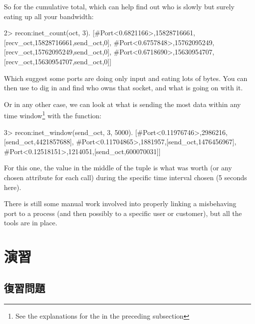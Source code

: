 So for the cumulative total, which can help find out who is slowly but surely eating up all your bandwidth:

\begin{VerbatimEshell}
2> recon:inet_count(oct, 3).
[{#Port<0.6821166>,15828716661,
  [{recv_oct,15828716661},{send_oct,0}]},
 {#Port<0.6757848>,15762095249,
  [{recv_oct,15762095249},{send_oct,0}]},
 {#Port<0.6718690>,15630954707,
  [{recv_oct,15630954707},{send_oct,0}]}]
\end{VerbatimEshell}

Which suggest some ports are doing only input and eating lots of bytes. You can then use  to dig in and find who owns that socket, and what is going on with it.

Or in any other case, we can look at what is sending the most data within any time window\footnote{See the explanations for the  in the preceding subsection} with the  function:

\begin{VerbatimEshell}
3> recon:inet_window(send_oct, 3, 5000).
[{#Port<0.11976746>,2986216,[{send_oct,4421857688}]},
 {#Port<0.11704865>,1881957,[{send_oct,1476456967}]},
 {#Port<0.12518151>,1214051,[{send_oct,600070031}]}]
\end{VerbatimEshell}

For this one, the value in the middle of the tuple is what  was worth (or any chosen attribute for each call) during the specific time interval chosen (5 seconds here).

There is still some manual work involved into properly linking a misbehaving port to a process (and then possibly to a specific user or customer), but all the tools are in place. 


\section{演習}

\subsection*{復習問題}

